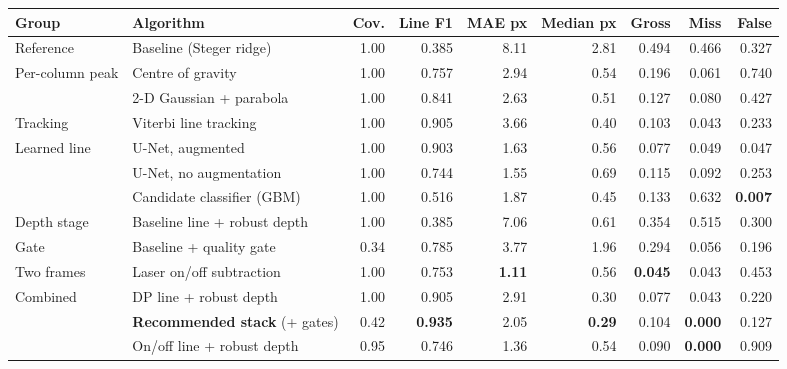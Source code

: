 \begin{tabular}{@{}llrrrrrrr@{}}
\toprule
Group & Algorithm & Cov. & Line F1 & MAE px & Median px & Gross & Miss & False \\
\midrule
Reference & Baseline (Steger ridge) & 1.00 & 0.385 & 8.11 & 2.81 & 0.494 & 0.466 & 0.327 \\
\addlinespace[2pt]
Per-column peak & Centre of gravity & 1.00 & 0.757 & 2.94 & 0.54 & 0.196 & 0.061 & 0.740 \\
 & 2-D Gaussian + parabola & 1.00 & 0.841 & 2.63 & 0.51 & 0.127 & 0.080 & 0.427 \\
\addlinespace[2pt]
Tracking & Viterbi line tracking & 1.00 & 0.905 & 3.66 & 0.40 & 0.103 & 0.043 & 0.233 \\
\addlinespace[2pt]
Learned line & U-Net, augmented & 1.00 & 0.903 & 1.63 & 0.56 & 0.077 & 0.049 & 0.047 \\
 & U-Net, no augmentation & 1.00 & 0.744 & 1.55 & 0.69 & 0.115 & 0.092 & 0.253 \\
 & Candidate classifier (GBM) & 1.00 & 0.516 & 1.87 & 0.45 & 0.133 & 0.632 & \textbf{0.007} \\
\addlinespace[2pt]
Depth stage & Baseline line + robust depth & 1.00 & 0.385 & 7.06 & 0.61 & 0.354 & 0.515 & 0.300 \\
\addlinespace[2pt]
Gate & Baseline + quality gate & 0.34 & 0.785 & 3.77 & 1.96 & 0.294 & 0.056 & 0.196 \\
\addlinespace[2pt]
Two frames & Laser on/off subtraction & 1.00 & 0.753 & \textbf{1.11} & 0.56 & \textbf{0.045} & 0.043 & 0.453 \\
\addlinespace[2pt]
Combined & DP line + robust depth & 1.00 & 0.905 & 2.91 & 0.30 & 0.077 & 0.043 & 0.220 \\
 & \textbf{Recommended stack} (+ gates) & 0.42 & \textbf{0.935} & 2.05 & \textbf{0.29} & 0.104 & \textbf{0.000} & 0.127 \\
 & On/off line + robust depth & 0.95 & 0.746 & 1.36 & 0.54 & 0.090 & \textbf{0.000} & 0.909 \\
\bottomrule
\end{tabular}
